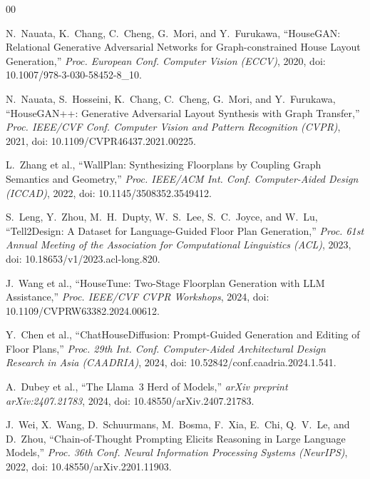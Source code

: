 \documentclass[10pt, twocolumn, letterpaper]{article}
\begin{document}
\begin{thebibliography}{00}

N.~Nauata, K.~Chang, C.~Cheng, G.~Mori, and Y.~Furukawa,
``HouseGAN: Relational Generative Adversarial Networks for Graph-constrained
House Layout Generation,''
\textit{Proc. European Conf. Computer Vision (ECCV)}, 2020,
doi: 10.1007/978-3-030-58452-8\_10.

N.~Nauata, S.~Hosseini, K.~Chang, C.~Cheng, G.~Mori, and Y.~Furukawa,
``HouseGAN++: Generative Adversarial Layout Synthesis with Graph Transfer,''
\textit{Proc. IEEE/CVF Conf. Computer Vision and Pattern Recognition (CVPR)},
2021, doi: 10.1109/CVPR46437.2021.00225.

L.~Zhang et al.,
``WallPlan: Synthesizing Floorplans by Coupling Graph Semantics and Geometry,''
\textit{Proc. IEEE/ACM Int. Conf. Computer-Aided Design (ICCAD)}, 2022,
doi: 10.1145/3508352.3549412.

S.~Leng, Y.~Zhou, M.~H.~Dupty, W.~S.~Lee, S.~C.~Joyce, and W.~Lu,
``Tell2Design: A Dataset for Language-Guided Floor Plan Generation,''
\textit{Proc. 61st Annual Meeting of the Association for Computational
Linguistics (ACL)}, 2023,
doi: 10.18653/v1/2023.acl-long.820.

J.~Wang et al.,
``HouseTune: Two-Stage Floorplan Generation with LLM Assistance,''
\textit{Proc. IEEE/CVF CVPR Workshops}, 2024,
doi: 10.1109/CVPRW63382.2024.00612.

Y.~Chen et al.,
``ChatHouseDiffusion: Prompt-Guided Generation and Editing of Floor Plans,''
\textit{Proc. 29th Int. Conf. Computer-Aided Architectural Design Research
in Asia (CAADRIA)}, 2024,
doi: 10.52842/conf.caadria.2024.1.541.

A.~Dubey et al.,
``The Llama~3 Herd of Models,''
\textit{arXiv preprint arXiv:2407.21783}, 2024,
doi: 10.48550/arXiv.2407.21783.

J.~Wei, X.~Wang, D.~Schuurmans, M.~Bosma, F.~Xia, E.~Chi, Q.~V.~Le,
and D.~Zhou,
``Chain-of-Thought Prompting Elicits Reasoning in Large Language Models,''
\textit{Proc. 36th Conf. Neural Information Processing Systems (NeurIPS)},
2022, doi: 10.48550/arXiv.2201.11903.


\end{thebibliography}
\end{document}
